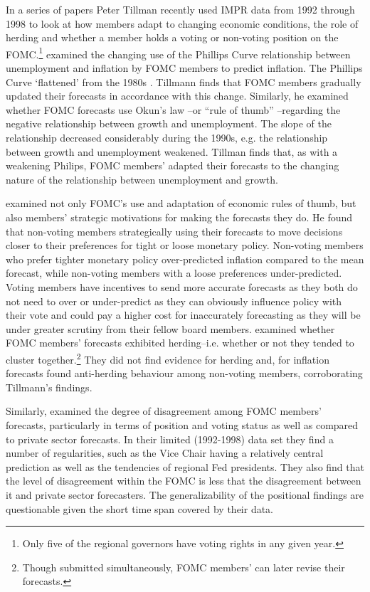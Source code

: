 \documentclass[a4paper]{article}\usepackage{graphicx, color}
\begin{document}
In a series of papers Peter Tillman recently used IMPR data from 1992 through 1998 to look at how members adapt to changing economic conditions, the role of herding and whether a member holds a voting or non-voting position on the FOMC.\footnote{Only five of the regional governors have voting rights in any given year.} \cite{Tillmann2010Philips} examined the changing use of the Phillips Curve relationship between unemployment and inflation by FOMC members to predict inflation. The Phillips Curve `flattened' from the 1980s \citep{Atkeson2001}. Tillmann finds that FOMC members gradually updated their forecasts in accordance with this change. Similarly, he examined whether FOMC forecasts use Okun's law \citeyearpar{Okun1962}--or ``rule of thumb'' \citep{KnotekII2007}--regarding the negative relationship between growth and unemployment. The slope of the relationship decreased considerably during the 1990s, e.g. the relationship between growth and unemployment weakened. Tillman finds that, as with a weakening Philips, FOMC members' adapted their forecasts to the changing nature of the relationship between unemployment and growth. 

\cite{Tillmann2011} examined not only FOMC's use and adaptation of economic rules of thumb, but also members' strategic motivations for making the forecasts they do. He found that non-voting members strategically using their forecasts to move decisions closer to their preferences for tight or loose monetary policy. Non-voting members who prefer tighter monetary policy over-predicted inflation compared to the mean forecast, while non-voting members with a loose preferences under-predicted. Voting members have incentives to send more accurate forecasts as they both do not need to over or under-predict as they can obviously influence policy with their vote and could pay a higher cost for inaccurately forecasting as they will be under greater scrutiny from their fellow board members. \cite{Rulke2011} examined whether FOMC members' forecasts exhibited herding--i.e. whether or not they tended to cluster together.\footnote{Though submitted simultaneously, FOMC members' can later revise their forecasts.} They did not find evidence for herding and, for inflation forecasts found anti-herding behaviour among non-voting members, corroborating Tillmann's \citeyearpar{Tillmann2011} findings. 

Similarly, \cite{Banternghansa2009} examined the degree of disagreement among FOMC members' forecasts, particularly in terms of position and voting status as well as compared to private sector forecasts. In their limited (1992-1998) data set they find a number of regularities, such as the Vice Chair having a relatively central prediction as well as the tendencies of regional Fed presidents. They also find that the level of disagreement within the FOMC is less that the disagreement between it and private sector forecasters. The generalizability of the positional findings are questionable given the short time span covered by their data. 
\end{document}
